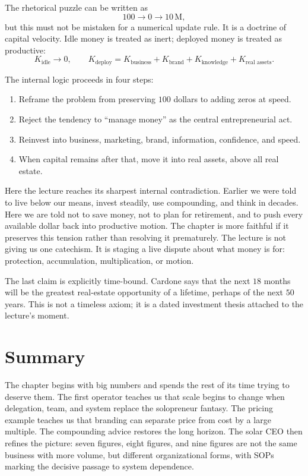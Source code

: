 The rhetorical puzzle can be written as
\begin{equation}
100 \longrightarrow 0 \longrightarrow 10\,\mathrm{M},
\end{equation}
but this must not be mistaken for a numerical update rule. It is a doctrine of capital velocity. Idle money is treated as inert; deployed money is treated as productive:
\begin{equation}
K_{\text{idle}} \rightarrow 0,
\qquad
K_{\text{deploy}}
=
K_{\text{business}}
+
K_{\text{brand}}
+
K_{\text{knowledge}}
+
K_{\text{real assets}}.
\end{equation}

The internal logic proceeds in four steps:
\begin{enumerate}
\item Reframe the problem from preserving \(100\) dollars to adding zeros at speed.
\item Reject the tendency to ``manage money'' as the central entrepreneurial act.
\item Reinvest into business, marketing, brand, information, confidence, and speed.
\item When capital remains after that, move it into real assets, above all real estate.
\end{enumerate}

Here the lecture reaches its sharpest internal contradiction. Earlier we were told to live below our means, invest steadily, use compounding, and think in decades. Here we are told not to save money, not to plan for retirement, and to push every available dollar back into productive motion. The chapter is more faithful if it preserves this tension rather than resolving it prematurely. The lecture is not giving us one catechism. It is staging a live dispute about what money is for: protection, accumulation, multiplication, or motion.

The last claim is explicitly time-bound. Cardone says that the next \(18\) months will be the greatest real-estate opportunity of a lifetime, perhaps of the next \(50\) years. This is not a timeless axiom; it is a dated investment thesis attached to the lecture's moment.

\section{Summary}

The chapter begins with big numbers and spends the rest of its time trying to deserve them. The first operator teaches us that scale begins to change when delegation, team, and system replace the solopreneur fantasy. The pricing example teaches us that branding can separate price from cost by a large multiple. The compounding advice restores the long horizon. The solar CEO then refines the picture: seven figures, eight figures, and nine figures are not the same business with more volume, but different organizational forms, with SOPs marking the decisive passage to system dependence.

